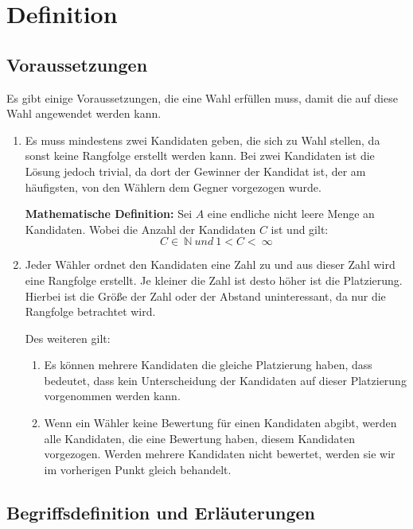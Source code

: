 \section{Definition}
\label{sec:definition}


\subsection{Voraussetzungen} 
\label{sec:voraussetzungen}
Es gibt einige Voraussetzungen, die eine Wahl erfüllen muss, damit die \schulze auf diese Wahl angewendet werden kann.

\begin{enumerate}
\item Es muss mindestens zwei Kandidaten geben, die sich zu Wahl stellen, da sonst keine Rangfolge erstellt werden kann. Bei zwei Kandidaten ist die Lösung jedoch trivial, da dort der Gewinner der Kandidat ist, der am häufigsten, von den Wählern dem Gegner vorgezogen wurde.

\textbf{Mathematische Definition:}
Sei $A$ eine endliche nicht leere Menge an Kandidaten. Wobei die Anzahl der Kandidaten $C$ ist und gilt: 
\[
  C \in\ \mathbb{N}\  und \ 1 < C <\ \infty
\]

\item Jeder Wähler ordnet den Kandidaten eine Zahl zu und aus dieser Zahl wird eine Rangfolge erstellt. Je kleiner die Zahl ist desto höher ist die Platzierung. Hierbei ist die Größe der Zahl oder der Abstand uninteressant, da nur die Rangfolge betrachtet wird.

Des weiteren gilt:
\begin{enumerate}
\item \label{itm:Regel1} Es können mehrere Kandidaten die gleiche Platzierung haben, dass bedeutet, dass kein Unterscheidung der Kandidaten auf dieser Platzierung vorgenommen werden kann. 
\item Wenn ein Wähler keine Bewertung für einen Kandidaten abgibt, werden alle Kandidaten, die eine Bewertung haben, diesem Kandidaten vorgezogen. Werden mehrere Kandidaten nicht bewertet, werden sie wir im vorherigen Punkt gleich behandelt.
\end{enumerate}
\end{enumerate}

\subsection{Begriffsdefinition und Erläuterungen } 
\label{sec:begriffsdefinition}

